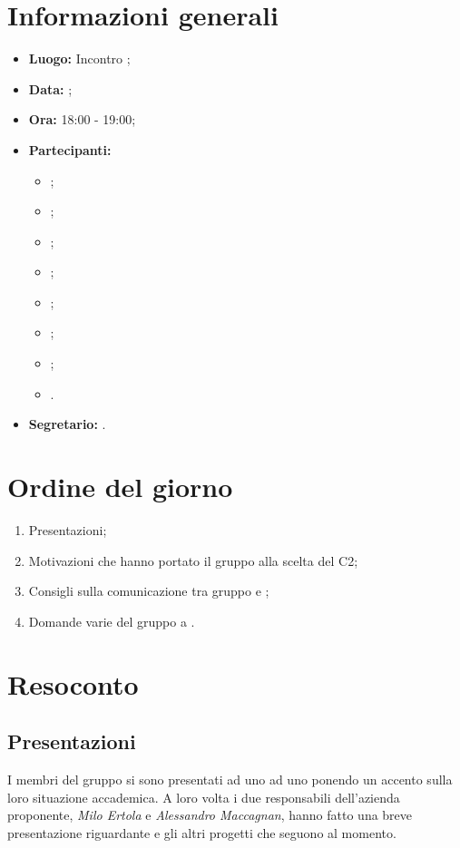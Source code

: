 \section{Informazioni generali}
\begin{itemize}
\item \textbf{Luogo:} Incontro ;
\item \textbf{Data:} \Data;
\item \textbf{Ora:} 18:00 - 19:00;
\item \textbf{Partecipanti:}
	\begin{itemize}
		\item \BL{}; 
		\item \FF{};
		\item \MM{}; 
		\item \PC{};
		\item \TG{};
		\item \TL{};
		\item \VD{};
		\item \Proponente.
	\end{itemize} 
\item \textbf{Segretario:} \PC{}.
\end{itemize}

\section{Ordine del giorno}
\begin{enumerate}
	\item Presentazioni;
	\item Motivazioni che hanno portato il gruppo {\Gruppo} alla scelta del  C2;
	\item Consigli sulla comunicazione tra gruppo e \Proponente;
	\item Domande varie del gruppo a \Proponente.
\end{enumerate}

\section{Resoconto}
\subsection{Presentazioni}
I membri del gruppo {\Gruppo} si sono presentati ad uno ad uno ponendo un accento sulla loro situazione accademica. A loro volta i due responsabili dell'azienda proponente, \textit{Milo Ertola} e \textit{Alessandro Maccagnan}, hanno fatto una breve presentazione riguardante {\Proponente} e gli altri progetti che seguono al momento.
